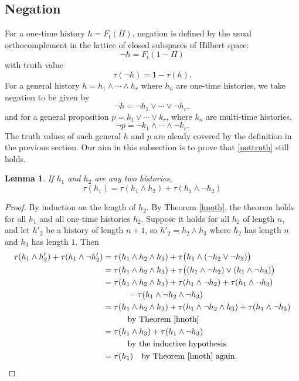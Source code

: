 \documentclass[12pt,reqno]{article}
\renewcommand{\(}{\left(}
\renewcommand{\)}{\right)}
\newcommand{\<}{\langle}
\renewcommand{\>}{\rangle}
\newcommand{\qqquad}{\quad\quad\quad}
\newcommand{\be}{\begin{equation}}
\newcommand{\ee}{\end{equation}}
\theoremstyle{plain} %
\newtheorem{lemma}{Lemma}
\begin{document}
\subsection{Negation}
\label{subsec:negation}

For a one-time history $h = F_t(\Pi)$, negation is defined by the usual orthocomplement in the lattice of closed subspaces of Hilbert space:
\[
\lnot h = F_t(1 - \Pi)
\]
with truth value
\be\label{nottruth}
\tau(\lnot h) = 1 - \tau(h).
\ee
For a general history $h = h_1\land\cdots\land h_r$ where $h_n$ are one-time histories, we take negation to be given by
\[
\lnot h = \lnot h_1\lor\cdots\lor\lnot h_r,
\]
and for a general proposition $p = k_1\lor\cdots\lor k_r$, where $k_n$ are multi-time histories,
\[
\lnot p = \lnot k_1\land\cdots\land\lnot k_r.
\]
The truth values of such general $h$ and $p$ are aleady covered by the definition in the previous section. Our aim in this subsection is to prove that \eqref{nottruth} still holds.

\begin{lemma}\label{hnothagain} If $h_1$ and $h_2$ are any two histories,
\[
\tau(h_1) = \tau(h_1\land h_2) + \tau(h_1\land\lnot h_2)
\]
\end{lemma}
\begin{proof}
By induction on the length of $h_2$. By Theorem \ref{hnoth}, the theorem holds for all $h_1$ and all one-time histories $h_2$. Suppose it holds for all $h_2$ of length $n$, and let $h'_2$ be a history of length $n+1$, so $h'_2 = h_2 \land h_3$ where $h_2$ has length $n$ and $h_3$ has length $1$. Then
\begin{align*}
\tau(h_1 \land h'_2) + \tau(h_1 \land \lnot h'_2)
&= \tau(h_1 \land h_2 \land h_3)  + \tau\big(h_1 \land (\lnot h_2 \lor\lnot h_3)\big)\\
&= \tau(h_1 \land h_2 \land h_3)  +\tau\big((h_1\land\lnot h_2)\lor(h_1\land\lnot h_3)\big)\\
&= \tau(h_1 \land h_2 \land h_3)  +\tau(h_1\land \lnot h_2) + \tau(h_1\land\lnot h_3)\\ 
&\qqquad -\tau(h_1\land\lnot h_2\land\lnot h_3)\\
&= \tau(h_1 \land h_2 \land h_3)  + \tau(h_1\land\lnot h_2\land h_3) + \tau(h_1\land \lnot h_3)\\ &\qqquad\text{by Theorem \ref{hnoth}}\\
&= \tau(h_1\land h_3) + \tau(h_1\land\lnot h_3)\\
&\qqquad \text{by the inductive hypothesis}\\
&= \tau (h_1) \quad\text{by Theorem \ref{hnoth} again}.
\end{align*}
\end{proof}
\end{document}
